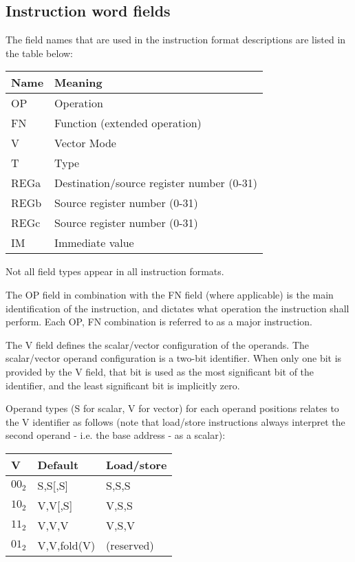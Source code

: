 \subsection{Instruction word fields}

The field names that are used in the instruction format descriptions are listed
in the table below:

\begin{tabular}{|l|l|}
  \hline
  \textbf{Name} & \textbf{Meaning} \\
  \hline
  OP & Operation \\
  \hline
  FN & Function (extended operation) \\
  \hline
  V  & Vector Mode \\
  \hline
  T  & Type \\
  \hline
  REGa & Destination/source register number (0-31) \\
  \hline
  REGb & Source register number (0-31) \\
  \hline
  REGc & Source register number (0-31) \\
  \hline
  IM & Immediate value \\
  \hline
\end{tabular}

Not all field types appear in all instruction formats.

The OP field in combination with the FN field (where applicable) is the main
identification of the instruction, and dictates what operation the instruction
shall perform. Each OP, FN combination is referred to as a major instruction.

The V field defines the scalar/vector configuration of the operands. The
scalar/vector operand configuration is a two-bit identifier. When only one bit
is provided by the V field, that bit is used as the most significant bit of the
identifier, and the least significant bit is implicitly zero.

Operand types (S for scalar, V for vector) for each operand positions relates
to the V identifier as follows (note that load/store instructions always
interpret the second operand - i.e. the base address - as a scalar):

\begin{tabular}{|l|l|l|}
  \hline
  \textbf{V} & \textbf{Default} & \textbf{Load/store} \\
  \hline
  $00_{2}$ & S,S[,S] & S,S,S \\
  \hline
  $10_{2}$ & V,V[,S] & V,S,S \\
  \hline
  $11_{2}$ & V,V,V & V,S,V \\
  \hline
  $01_{2}$ & V,V,fold(V) & (reserved) \\
  \hline
\end{tabular}

